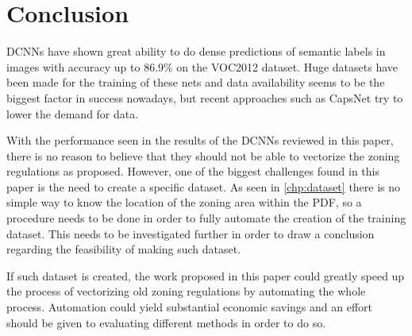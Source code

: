 \chapter{Conclusion}
DCNNs have shown great ability to do dense predictions of semantic labels in images with accuracy up to 86.9\% on the VOC2012 dataset. Huge datasets have been made for the training of these nets and data availability seems to be the biggest factor in success nowadays, but recent approaches such as CapsNet try to lower the demand for data.

With the performance seen in the results of the DCNNs reviewed in this paper, there is no reason to believe that they should not be able to vectorize the zoning regulations as proposed. However, one of the biggest challenges found in this paper is the need to create a specific dataset. As seen in \autoref{chp:dataset} there is no simple way to know the location of the zoning area within the PDF, so a procedure needs to be done in order to fully automate the creation of the training dataset. This needs to be investigated further in order to draw a conclusion regarding the feasibility of making such dataset.

If such dataset is created, the work proposed in this paper could greatly speed up the process of vectorizing old zoning regulations by automating the whole process. Automation could yield substantial economic savings and an effort should be given to evaluating different methods in order to do so.